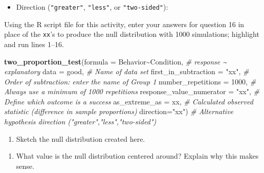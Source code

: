 \documentclass[
]{report}
\newenvironment{Shaded}{\begin{snugshade}}{\end{snugshade}}
\newcommand{\AttributeTok}[1]{\textcolor[rgb]{0.13,0.29,0.53}{#1}}
\newcommand{\CommentTok}[1]{\textcolor[rgb]{0.56,0.35,0.01}{\textit{#1}}}
\newcommand{\DecValTok}[1]{\textcolor[rgb]{0.00,0.00,0.81}{#1}}
\newcommand{\FunctionTok}[1]{\textcolor[rgb]{0.13,0.29,0.53}{\textbf{#1}}}
\newcommand{\NormalTok}[1]{#1}
\newcommand{\SpecialCharTok}[1]{\textcolor[rgb]{0.81,0.36,0.00}{\textbf{#1}}}
\newcommand{\StringTok}[1]{\textcolor[rgb]{0.31,0.60,0.02}{#1}}
\providecommand{\tightlist}{%
  \setlength{\itemsep}{0pt}\setlength{\parskip}{0pt}}
\begin{document}
\vspace{.15in}

\begin{itemize}
\tightlist
\item
  Direction (\texttt{"greater"}, \texttt{"less"}, or \texttt{"two-sided"}):
\end{itemize}

\vspace{.15in}

Using the R script file for this activity, enter your answers for question 16 in place of the \texttt{xx}'s to produce the null distribution with 1000 simulations; highlight and run lines 1--16.

\begin{Shaded}
\begin{Highlighting}[]
\FunctionTok{two\_proportion\_test}\NormalTok{(}\AttributeTok{formula =}\NormalTok{ Behavior}\SpecialCharTok{\textasciitilde{}}\NormalTok{Condition, }\CommentTok{\# response \textasciitilde{} explanatory}
    \AttributeTok{data =}\NormalTok{ good, }\CommentTok{\# Name of data set}
    \AttributeTok{first\_in\_subtraction =} \StringTok{"xx"}\NormalTok{, }\CommentTok{\# Order of subtraction: enter the name of Group 1}
    \AttributeTok{number\_repetitions =} \DecValTok{1000}\NormalTok{, }\CommentTok{\# Always use a minimum of 1000 repetitions}
    \AttributeTok{response\_value\_numerator =} \StringTok{"xx"}\NormalTok{, }\CommentTok{\# Define which outcome is a success}
    \AttributeTok{as\_extreme\_as =}\NormalTok{ xx, }\CommentTok{\# Calculated observed statistic (difference in sample proportions)}
    \AttributeTok{direction=}\StringTok{"xx"}\NormalTok{) }\CommentTok{\# Alternative hypothesis direction ("greater","less","two{-}sided")}
\end{Highlighting}
\end{Shaded}

\begin{enumerate}
\def\labelenumi{\arabic{enumi}.}
\setcounter{enumi}{2}
\tightlist
\item
  Sketch the null distribution created here.
\end{enumerate}

\vspace{1.5in}

\begin{enumerate}
\def\labelenumi{\arabic{enumi}.}
\setcounter{enumi}{3}
\tightlist
\item
  What value is the null distribution centered around? Explain why this makes sense.
\end{enumerate}
\end{document}
